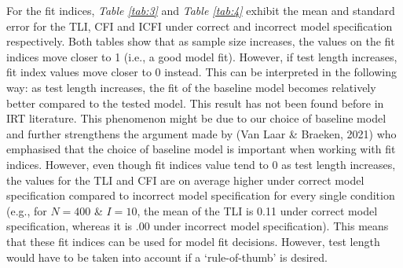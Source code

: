 \documentclass[Royal,sageapa,times,doublespace]{sagej}
\begin{document}
\indent For the fit indices, \textit{Table \ref{tab:3}} and \textit{Table \ref{tab:4}} exhibit the mean and standard error for the TLI, CFI and ICFI under correct and incorrect model specification respectively. Both tables show that as sample size increases, the values on the fit indices move closer to 1 (i.e., a good model fit). However, if test length increases, fit index values move closer to 0 instead. This can be interpreted in the following way: as test length increases, the fit of the baseline model becomes relatively better compared to the tested model. This result has not been found before in IRT literature. This phenomenon might be due to our choice of baseline model and further strengthens the argument made by (Van Laar \& Braeken, 2021) who emphasised that the choice of baseline model is important when working with fit indices. However, even though fit indices value tend to 0 as test length increases, the values for the TLI and CFI are on average higher under correct model specification compared to incorrect model specification for every single condition (e.g., for $N = 400$ \& $I = 10$, the mean of the TLI is 0.11 under correct model specification, whereas it is .00 under incorrect model specification). This means that these fit indices can be used for model fit decisions. However, test length would have to be taken into account if a `rule-of-thumb' is desired. \\
\end{document}
